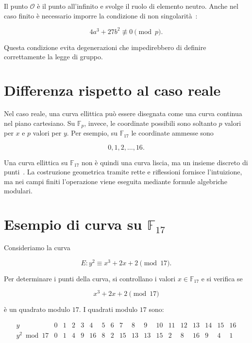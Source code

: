 \documentclass[12pt,a4paper,oneside]{report}
\begin{document}
Il punto \(\mathcal{O}\) è il punto all'infinito e svolge il ruolo di elemento neutro. Anche nel caso finito è necessario imporre la condizione di non singolarità~\cite{margara_ec}:

\begin{equation}
    4a^3+27b^2\not\equiv 0 \pmod p.
    \label{eq:nonsingular-fp}
\end{equation}

Questa condizione evita degenerazioni che impedirebbero di definire correttamente la legge di gruppo.

\section{Differenza rispetto al caso reale}

Nel caso reale, una curva ellittica può essere disegnata come una curva continua nel piano cartesiano. Su \(\mathbb{F}_p\), invece, le coordinate possibili sono soltanto \(p\) valori per \(x\) e \(p\) valori per \(y\). Per esempio, su \(\mathbb{F}_{17}\) le coordinate ammesse sono

\[
0,1,2,\ldots,16.
\]

Una curva ellittica su \(\mathbb{F}_{17}\) non è quindi una curva liscia, ma un insieme discreto di punti~\cite{margara_ec}. La costruzione geometrica tramite rette e riflessioni fornisce l'intuizione, ma nei campi finiti l'operazione viene eseguita mediante formule algebriche modulari.

\section{Esempio di curva su \texorpdfstring{\(\mathbb{F}_{17}\)}{F17}}

Consideriamo la curva

\begin{equation}
    E: y^2 \equiv x^3+2x+2 \pmod{17}.
    \label{eq:example-curve-f17}
\end{equation}

Per determinare i punti della curva, si controllano i valori \(x\in\mathbb{F}_{17}\) e si verifica se

\[
x^3+2x+2 \pmod{17}
\]

è un quadrato modulo \(17\). I quadrati modulo \(17\) sono:

\[
\begin{array}{c|ccccccccccccccccc}
y & 0&1&2&3&4&5&6&7&8&9&10&11&12&13&14&15&16\\
\hline
y^2 \bmod 17 & 0&1&4&9&16&8&2&15&13&13&15&2&8&16&9&4&1
\end{array}
\]
\end{document}
